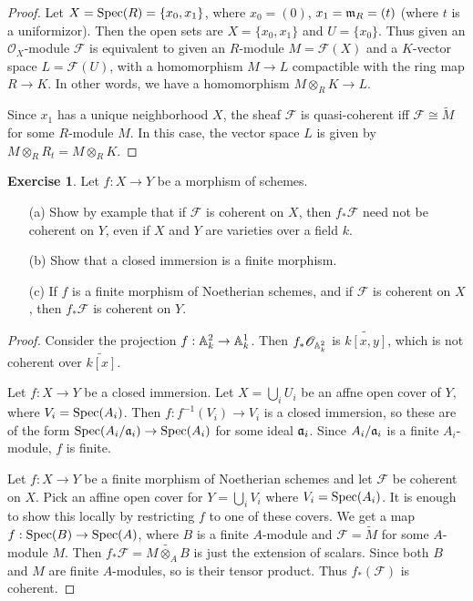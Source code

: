 \documentclass[11pt]{book}
\theoremstyle{definition}
\newtheorem{exercise}{Exercise}[section]
\begin{document}
\begin{proof}
Let $X=\mathrm{Spec}(R)=\{x_0,x_1\}$, where $x_0=(0)$, $x_1=\mathfrak{m}_R=(t)$ (where $t$ is a uniformizor). Then the open sets are $X=\{x_0,x_1\}$ and $U=\{x_0\}$. Thus given an $\mathscr{O}_X$-module $\mathscr{F}$ is equivalent to given an $R$-module $M=\mathscr{F}(X)$ and a $K$-vector space $L=\mathscr{F}(U)$, with a homomorphism $M\to L$ compactible with the ring map $R\to K$. In other words, we have a homomorphism $M\otimes_RK\to L$.\par
Since $x_1$ has a unique neighborhood $X$, the sheaf $\mathscr{F}$ is quasi-coherent iff $\mathscr{F}\cong\widetilde{M}$ for some $R$-module $M$. In this case, the vector space $L$ is given by $M\otimes_RR_{t}=M\otimes_RK$.
\end{proof}
\begin{exercise}
Let $f:X\to Y$ be a morphism of schemes.
\begin{itemize}
\item[(a)] Show by example that if $\mathscr{F}$ is coherent on $X$, then $f_*\mathscr{F}$ need not be coherent on $Y$, even if $X$ and $Y$ are varieties over a field $k$.
\item[(b)] Show that a closed immersion is a finite morphism.
\item[(c)] If $f$ is a finite morphism of Noetherian schemes, and if $\mathscr{F}$ is coherent on $X$, then $f_*\mathscr{F}$ is coherent on $Y$.
\end{itemize}
\end{exercise}
\begin{proof}
Consider the projection $f:\mathbb{A}_k^2\to\mathbb{A}_k^1$. Then $f_*\mathscr{O}_{\mathbb{A}_k^2}$ is $\widetilde{k[x,y]}$, which is not coherent over $\widetilde{k[x]}$.\par
Let $f:X\to Y$ be a closed immersion. Let $X=\bigcup_iU_i$ be an affne open cover of $Y$, where $V_i=\mathrm{Spec}(A_i)$. Then $f:f^{-1}(V_i)\to V_i$ is a closed immersion, so these are of the form $\mathrm{Spec}(A_i/\mathfrak{a}_i)\to\mathrm{Spec}(A_i)$ for some ideal $\mathfrak{a}_i$. Since $A_i/\mathfrak{a}_i$ is a finite $A_i$-module, $f$ is finite.\par
Let $f:X\to Y$ be a finite morphism of Noetherian schemes and let $\mathscr{F}$ be coherent on $X$. Pick an affine open cover for $Y=\bigcup_iV_i$ where $V_i=\mathrm{Spec}(A_i)$. It is enough to show this locally by restricting $f$ to one of these covers. We get a map $f:\mathrm{Spec}(B)\to\mathrm{Spec}(A)$, where $B$ is a finite $A$-module and $\mathscr{F}=\widetilde{M}$ for some $A$-module $M$. Then $f_*\mathscr{F}=\widetilde{M\otimes_AB}$ is just the extension of scalars. Since both $B$ and $M$ are finite $A$-modules, so is their tensor product. Thus $f_*(\mathscr{F})$ is coherent.
\end{proof}
\end{document}
